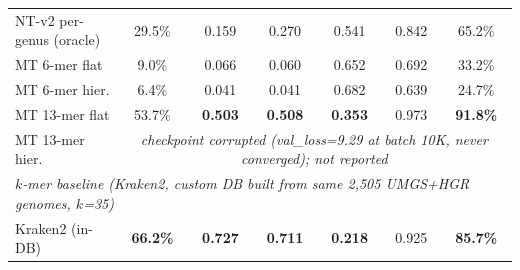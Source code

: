 \begin{table}[htbp]
{\begin{tabular}{lcccccc}
        NT-v2 per-genus (oracle)    & 29.5\% & 0.159 & 0.270 & 0.541 & 0.842 & 65.2\% \\
        MT  6-mer flat    &  9.0\% & 0.066 & 0.060 & 0.652 & 0.692 & 33.2\% \\
        MT  6-mer hier.   &  6.4\% & 0.041 & 0.041 & 0.682 & 0.639 & 24.7\% \\
        MT 13-mer flat    & 53.7\% & \textbf{0.503} & \textbf{0.508} & \textbf{0.353} & 0.973 & \textbf{91.8\%} \\
        MT 13-mer hier.   & \multicolumn{6}{c}{\textit{checkpoint corrupted (val\_loss=9.29 at batch 10K, never converged); not reported}} \\
        \midrule
        \multicolumn{7}{l}{\textit{$k$-mer baseline (Kraken2, custom DB built from same 2{,}505 UMGS+HGR genomes, $k$=35)}} \\
        Kraken2 (in-DB)   & \textbf{66.2\%} & \textbf{0.727} & \textbf{0.711} & \textbf{0.218} & 0.925 & \textbf{85.7\%} \\
        \bottomrule
    \end{tabular}%
    }
\end{table}


